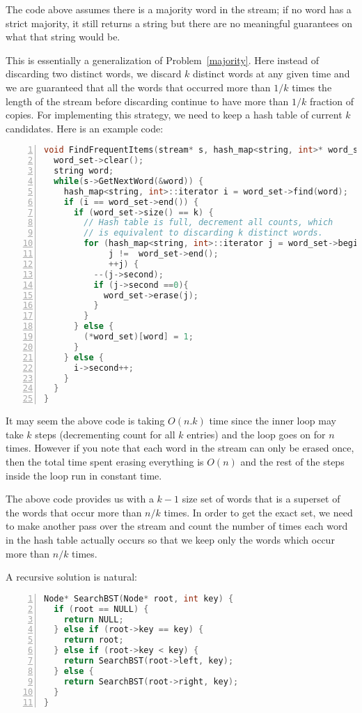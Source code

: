 The code above assumes there is a majority word in the
stream; if no word has a strict majority, it still returns
a string but there are no meaningful guarantees on what that string would be.

This is essentially a generalization of Problem~\ref{majority}. Here
instead of discarding two distinct words, we discard $k$ distinct words
at any given time and we are guaranteed that all the words that occurred
more than $1/k$ times the length of the stream before discarding continue
to have more than $1/k$ fraction of copies.  For implementing this
strategy, we need to keep a hash table of current $k$ candidates. Here
is an example code:
\begin{lstlisting}[basicstyle=\footnotesize,numbers=left,breaklines=true,language=C++]
void FindFrequentItems(stream* s, hash_map<string, int>* word_set, int k) {
  word_set->clear();
  string word;
  while(s->GetNextWord(&word)) {
    hash_map<string, int>::iterator i = word_set->find(word);
    if (i == word_set->end()) {
      if (word_set->size() == k) {
        // Hash table is full, decrement all counts, which 
        // is equivalent to discarding k distinct words.
        for (hash_map<string, int>::iterator j = word_set->begin();
             j !=  word_set->end();
             ++j) {
          --(j->second);
          if (j->second ==0){
            word_set->erase(j);
          }
        }
      } else {
        (*word_set)[word] = 1;
      }
    } else {
      i->second++;
    }
  }
}
\end{lstlisting}
It may seem the above code is taking $O(n.k)$ time since
the inner loop may take $k$ steps (decrementing count for all $k$
entries) and the loop goes on for $n$ times. However if you note that
each word in the stream can only be erased once, then the total time spent erasing everything is $O(n)$ and the rest of the steps inside the loop run in constant time.

The above code provides us with a $k -1$ size set of words
that is a superset of the words that occur more than $n/k$ times. 
In order to get the exact set, we need to make another pass over the
stream and count the number of times each word in the hash table
actually occurs so that we  keep only the words which occur more than $n/k$ times.


A recursive solution is natural:
\begin{lstlisting}[basicstyle=\footnotesize,numbers=left,breaklines=true,language=C++]
Node* SearchBST(Node* root, int key) {
  if (root == NULL) {
    return NULL;
  } else if (root->key == key) {
    return root;
  } else if (root->key < key) {
    return SearchBST(root->left, key);
  } else {
    return SearchBST(root->right, key);
  }
}
\end{lstlisting}

